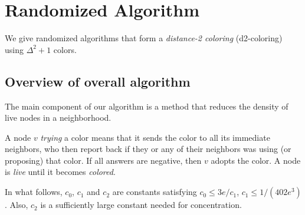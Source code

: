 \section{Randomized Algorithm}
\label{sec:randAlg}
We give randomized {\congest} algorithms that form a \emph{distance-2 coloring} (d2-coloring) using $\Delta^2+1$ colors.

\subsection{Overview of overall algorithm }

The main component of our algorithm is a method  that reduces the density of live nodes in a neighborhood. 

A node $v$ \emph{trying} a color means that it sends the color to all its immediate neighbors, who then report back if they or any of their neighbors was using (or proposing) that color.
If all answers are negative, then $v$ adopts the color. A node is \emph{live} until it becomes \emph{colored}.

In what follows, $c_0$, $c_1$ and $c_2$ are constants satisfying $c_0 \le 3e/c_1$, $c_1 \le 1/(402 e^3)$. Also, $c_2$ is a sufficiently large constant needed for concentration.

